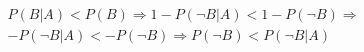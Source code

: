 \item

\[\begin{array}{l}
P(B|A) < P(B) \Rightarrow 1 - P(\neg B|A) < 1 - P(\neg B) \Rightarrow \\
 - P(\neg B|A) <  - P(\neg B) \Rightarrow P(\neg B) < P(\neg B|A)
\end{array}\]